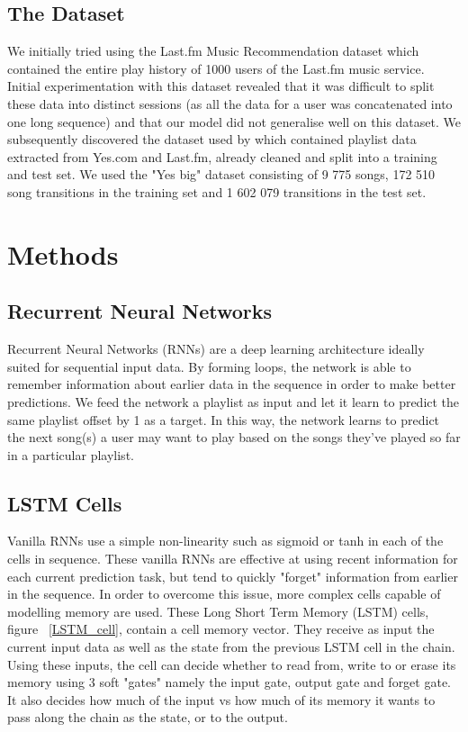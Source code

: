 \documentclass{article} %
\begin{document}
\subsection{The Dataset}
We initially tried using the Last.fm Music Recommendation dataset \cite{lastfm} which contained the entire play history of 1000 users of the Last.fm music service. Initial experimentation with this dataset revealed that it was difficult to split these data into distinct sessions (as all the data for a user was concatenated into one long sequence) and that our model did not generalise well on this dataset. We subsequently discovered the dataset used by \cite{playlist-prediction} which contained playlist data extracted from Yes.com and Last.fm, already cleaned and split into a training and test set. We used the "Yes big" dataset consisting of 9 775 songs, 172 510 song transitions in the training set and 1 602 079 transitions in the test set. 

\section{Methods}
\subsection{Recurrent Neural Networks}
Recurrent Neural Networks (RNNs) are a deep learning architecture ideally suited for sequential input data. By forming loops, the network is able to remember information about earlier data in the sequence in order to make better predictions. We feed the network a playlist as input and let it learn to predict the same playlist offset by 1 as a target. In this way, the network learns to predict the next song(s) a user may want to play based on the songs they've played so far in a particular playlist. \cite{LSTM}

\subsection{LSTM Cells}
Vanilla RNNs use a simple non-linearity such as sigmoid or tanh in each of the cells in sequence. These vanilla RNNs are effective at using recent information for each current prediction task, but tend to quickly "forget" information from earlier in the sequence. In order to overcome this issue, more complex cells capable of modelling memory are used. These Long Short Term Memory (LSTM) cells, figure ~\ref{LSTM_cell}, contain a cell memory vector. They receive as input the current input data as well as the state from the previous LSTM cell in the chain. Using these inputs, the cell can decide whether to read from, write to or erase its memory using 3 soft "gates" namely the input gate, output gate and forget gate. It also decides how much of the input vs how much of its memory it wants to pass along the chain as the state, or to the output. \cite{LSTM} 
\end{document}
